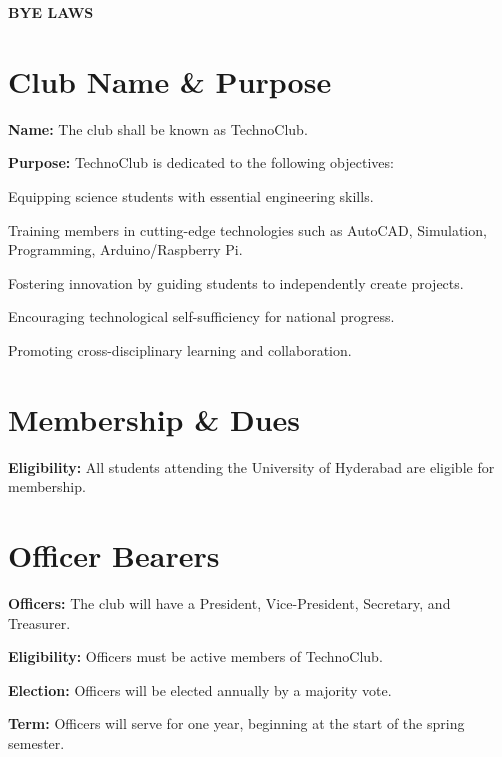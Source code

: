 \documentclass{article}
\begin{document}
\noindent \textbf{\huge BYE LAWS}

\vspace{5mm}

\section{Club Name \& Purpose}

\noindent \textbf{Name:} The club shall be known as TechnoClub.

\noindent \textbf{Purpose:} TechnoClub is dedicated to the following objectives:

\begin{aims}
\item Equipping science students with essential engineering skills.
\item Training members in cutting-edge technologies such as AutoCAD, Simulation, Programming, Arduino/Raspberry Pi.
\item Fostering innovation by guiding students to independently create projects.
\item Encouraging technological self-sufficiency for national progress.
\item Promoting cross-disciplinary learning and collaboration.
\end{aims}

\vspace{5mm}

\section{Membership \& Dues}

\noindent \textbf{Eligibility:} All students attending the University of Hyderabad are eligible for membership.

\vspace{5mm}

\section{Officer Bearers}

\noindent \textbf{Officers:} The club will have a President, Vice-President, Secretary, and Treasurer.

\noindent \textbf{Eligibility:} Officers must be active members of TechnoClub.

\noindent \textbf{Election:} Officers will be elected annually by a majority vote.

\noindent \textbf{Term:} Officers will serve for one year, beginning at the start of the spring semester.
\end{document}
